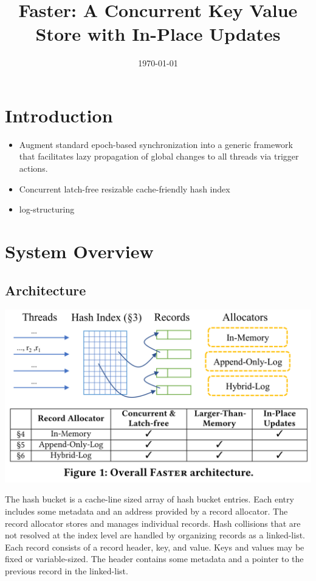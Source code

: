 \documentclass[11pt]{article}
\date{\today}
\title{Faster: A Concurrent Key Value Store with In-Place Updates}
\begin{document}
\maketitle
\section{Introduction}
\label{sec:org88afd99}
\begin{itemize}
\item Augment standard epoch-based synchronization into a generic framework that facilitates lazy
propagation of global changes to all threads via trigger actions.
\item Concurrent latch-free resizable cache-friendly hash index
\item log-structuring
\end{itemize}
\section{System Overview}
\label{sec:org2195c92}
\subsection{Architecture}
\label{sec:orgbee3b4d}
\begin{center}
\includegraphics[width=.8\textwidth]{../../images/papers/219.png}
\label{}
\end{center}

The hash bucket is a cache-line sized array of hash bucket entries. Each entry includes some metadata
and an address provided by a record allocator. The record allocator stores and manages individual
records. Hash collisions that are not resolved at the index level are handled by organizing records as
a linked-list. Each record consists of a record header, key, and value. Keys and values may be fixed
or variable-sized. The header contains some metadata and a pointer to the previous record in the
linked-list.
\end{document}
